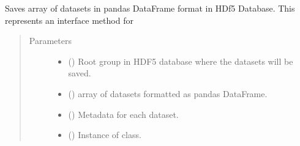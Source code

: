 \documentclass[letterpaper,10pt,english]{sphinxmanual}
\begin{document}
\begin{fulllineitems}
\begin{fulllineitems}
\begin{quote}
\begin{description}
\begin{itemize}
\end{itemize}

\end{description}\end{quote}

\end{fulllineitems}


\begin{fulllineitems}
\label{\detokenize{data:mleap.data.data.Data.pandas_to_db}}
Saves array of datasets in pandas DataFrame format in HDf5 Database.
This represents an interface method for {\hyperref[\detokenize{shared:mleap.shared.files_io.FilesIO.save_datasets}]{}}
\begin{quote}\begin{description}
\item[{Parameters}] \leavevmode\begin{itemize}
\item {} 
 () \textendash{} Root group in HDF5 database where the datasets will be saved.

\item {} 
 () \textendash{} array of datasets formatted as pandas DataFrame.

\item {} 
 () \textendash{} Metadata for each dataset.

\item {} 
 ({\hyperref[\detokenize{shared:mleap.shared.files_io.FilesIO}]{}}) \textendash{} Instance of {\hyperref[\detokenize{shared:mleap.shared.files_io.FilesIO}]{}} class.

\end{itemize}

\end{description}\end{quote}

\end{fulllineitems}


\end{fulllineitems}
\end{document}
